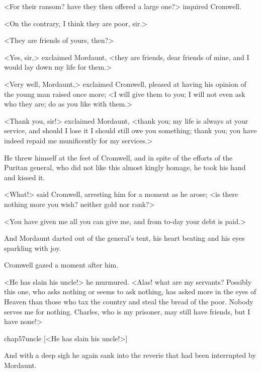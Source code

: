 <For their ransom? have they then offered a large one?> inquired Cromwell.

<On the contrary, I think they are poor, sir.>

<They are friends of yours, then?>

<Yes, sir,> exclaimed Mordaunt, <they are friends, dear friends of mine, and I would lay down my life for them.>

<Very well, Mordaunt,> exclaimed Cromwell, pleased at having his opinion of the young man raised once more; <I will give them to you; I will not even ask who they are; do as you like with them.>

<Thank you, sir!> exclaimed Mordaunt, <thank you; my life is always at your service, and should I lose it I should still owe you something; thank you; you have indeed repaid me munificently for my services.>

He threw himself at the feet of Cromwell, and in spite of the efforts of the Puritan general, who did not like this almost kingly homage, he took his hand and kissed it.

<What!> said Cromwell, arresting him for a moment as he arose; <is there nothing more you wish? neither gold nor rank?>

<You have given me all you can give me, and from to-day your debt is paid.>

And Mordaunt darted out of the general's tent, his heart beating and his eyes sparkling with joy.

Cromwell gazed a moment after him.

<He has slain his uncle!> he murmured. <Alas! what are my servants? Possibly this one, who asks nothing or seems to ask nothing, has asked more in the eyes of Heaven than those who tax the country and steal the bread of the poor. Nobody serves me for nothing. Charles, who is my prisoner, may still have friends, but I have none!>

\begin{bwbigpic}
	[\basicscale] 
	{chap57uncle}
	[<He has slain his uncle!>]
\end{bwbigpic}


And with a deep sigh he again sank into the reverie that had been interrupted by Mordaunt. 